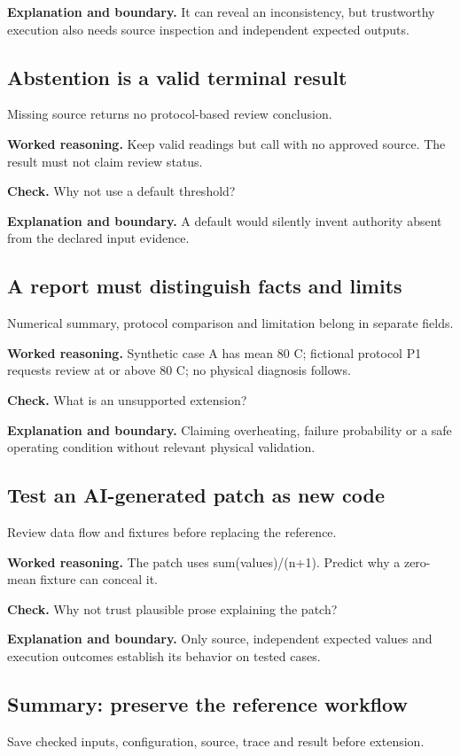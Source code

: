 \textbf{Explanation and boundary.} It can reveal an inconsistency, but trustworthy execution also needs source inspection and independent expected outputs.

\subsection{Abstention is a valid terminal result}
Missing source returns no protocol-based review conclusion.

\textbf{Worked reasoning.} Keep valid readings but call with no approved source. The result must not claim review status.

\textbf{Check.} Why not use a default threshold?

\textbf{Explanation and boundary.} A default would silently invent authority absent from the declared input evidence.

\subsection{A report must distinguish facts and limits}
Numerical summary, protocol comparison and limitation belong in separate fields.

\textbf{Worked reasoning.} Synthetic case A has mean 80 C; fictional protocol P1 requests review at or above 80 C; no physical diagnosis follows.

\textbf{Check.} What is an unsupported extension?

\textbf{Explanation and boundary.} Claiming overheating, failure probability or a safe operating condition without relevant physical validation.

\subsection{Test an AI-generated patch as new code}
Review data flow and fixtures before replacing the reference.

\textbf{Worked reasoning.} The patch uses sum(values)/(n+1). Predict why a zero-mean fixture can conceal it.

\textbf{Check.} Why not trust plausible prose explaining the patch?

\textbf{Explanation and boundary.} Only source, independent expected values and execution outcomes establish its behavior on tested cases.

\subsection{Summary: preserve the reference workflow}
Save checked inputs, configuration, source, trace and result before extension.

